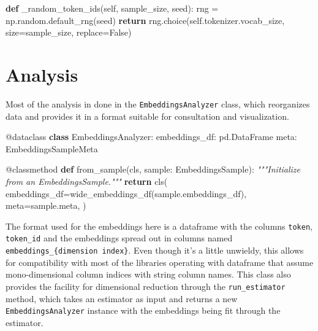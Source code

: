 \documentclass[
  a4paper, twoside, 10pt, titlepage]{book}
\newenvironment{Shaded}{}{}
\newcommand{\AttributeTok}[1]{\textcolor[rgb]{0.49,0.56,0.16}{#1}}
\newcommand{\CommentTok}[1]{\textcolor[rgb]{0.38,0.63,0.69}{\textit{#1}}}
\newcommand{\ControlFlowTok}[1]{\textcolor[rgb]{0.00,0.44,0.13}{\textbf{#1}}}
\newcommand{\KeywordTok}[1]{\textcolor[rgb]{0.00,0.44,0.13}{\textbf{#1}}}
\newcommand{\NormalTok}[1]{#1}
\newcommand{\OperatorTok}[1]{\textcolor[rgb]{0.40,0.40,0.40}{#1}}
\newcommand{\VariableTok}[1]{\textcolor[rgb]{0.10,0.09,0.49}{#1}}
\begin{document}
\begin{Shaded}
\begin{Highlighting}[]
    \KeywordTok{def}\NormalTok{ \_random\_token\_ids(}\VariableTok{self}\NormalTok{, sample\_size, seed):}
\NormalTok{        rng }\OperatorTok{=}\NormalTok{ np.random.default\_rng(seed)}
        \ControlFlowTok{return}\NormalTok{ rng.choice(}\VariableTok{self}\NormalTok{.tokenizer.vocab\_size, size}\OperatorTok{=}\NormalTok{sample\_size, replace}\OperatorTok{=}\VariableTok{False}\NormalTok{)}
\end{Highlighting}
\end{Shaded}

\section{Analysis}\label{analysis}

Most of the analysis in done in the \texttt{EmbeddingsAnalyzer} class,
which reorganizes data and provides it in a format suitable for
consultation and visualization.

\begin{Shaded}
\begin{Highlighting}[]
\AttributeTok{@dataclass}
\KeywordTok{class}\NormalTok{ EmbeddingsAnalyzer:}
\NormalTok{    embeddings\_df: pd.DataFrame}
\NormalTok{    meta: EmbeddingsSampleMeta}

    \AttributeTok{@classmethod}
    \KeywordTok{def}\NormalTok{ from\_sample(cls, sample: EmbeddingsSample):}
        \CommentTok{"""Initialize from an EmbeddingsSample."""}
        \ControlFlowTok{return}\NormalTok{ cls(}
\NormalTok{            embeddings\_df}\OperatorTok{=}\NormalTok{wide\_embeddings\_df(sample.embeddings\_df),}
\NormalTok{            meta}\OperatorTok{=}\NormalTok{sample.meta,}
\NormalTok{        )}
\end{Highlighting}
\end{Shaded}

The format used for the embeddings here is a dataframe with the columns
\texttt{token}, \texttt{token\_id} and the embeddings spread out in
columns named \texttt{embeddings\_\{dimension\ index\}}. Even though
it's a little unwieldy, this allows for compatibility with most of the
libraries operating with dataframe that assume mono-dimensional column
indices with string column names. This class also provides the facility
for dimensional reduction through the \texttt{run\_estimator} method,
which takes an estimator as input and returns a new
\texttt{EmbeddingsAnalyzer} instance with the embeddings being fit
through the estimator.
\end{document}
